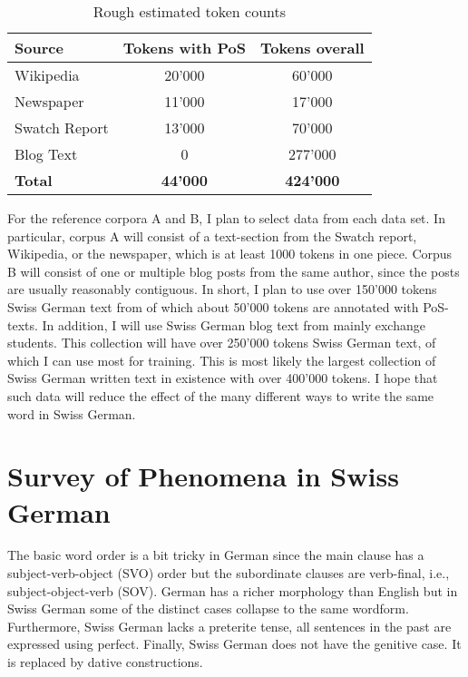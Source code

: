 \documentclass[11pt,letterpaper, covington]{article}
\begin{document}
\begin{table}
\center
\begin{tabular}{ | l | c | c | }
   \hline
   \textbf{Source} & \textbf{Tokens with PoS} & \textbf{Tokens overall} \\ \hline
   Wikipedia & 20'000 & 60'000 \\
   Newspaper & 11'000 & 17'000 \\ 
   Swatch Report & 13'000 & 70'000 \\
   Blog Text & 0 & 277'000 \\ \hline
   \textbf{Total} & \textbf{44'000} & \textbf{424'000} \\ \hline
\end{tabular}
\caption{Rough estimated token counts}
\end{table}

For the reference corpora A and B, I plan to select data from each data set. In particular, corpus A will consist of a text-section from the Swatch report, Wikipedia, or the newspaper, which is at least 1000 tokens in one piece. Corpus B will consist of one or multiple blog posts from the same author, since the posts are usually reasonably contiguous. In short, I plan to use over 150'000 tokens Swiss German text from \cite{AH14} of which about 50'000 tokens are annotated with PoS-texts. In addition, I will use Swiss German blog text from mainly exchange students. This collection will have over 250'000 tokens Swiss German text, of which I can use most for training. This is most likely the largest collection of Swiss German written text in existence with over 400'000 tokens. I hope that such data will reduce the effect of the many different ways to write the same word in Swiss German.

\section{Survey of Phenomena in Swiss German}

The basic word order is a bit tricky in German since the main clause has a subject-verb-object (SVO) order but the subordinate clauses are verb-final, i.e., subject-object-verb (SOV). German has a richer morphology than English but in Swiss German some of the distinct cases collapse to the same wordform. Furthermore, Swiss German lacks a preterite tense, all sentences in the past are expressed using perfect. Finally, Swiss German does not have the genitive case. It is replaced by dative constructions. \citep{Scherrer11}
\end{document}
